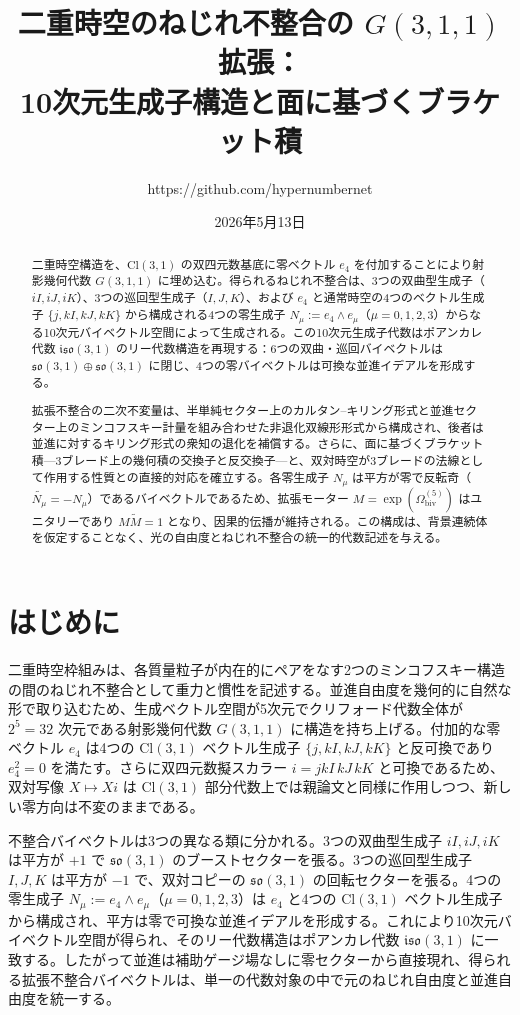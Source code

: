 \documentclass[11pt,a4paper]{article}
\title{二重時空のねじれ不整合の $G(3,1,1)$ 拡張：\\
10次元生成子構造と面に基づくブラケット積}
\author{https://github.com/hypernumbernet}
\date{2026年5月13日}
\begin{document}
\maketitle

\begin{abstract}
二重時空構造を、$\mathrm{Cl}(3,1)$ の双四元数基底に零ベクトル $e_{4}$ を付加することにより射影幾何代数 $G(3,1,1)$ に埋め込む。得られるねじれ不整合は、3つの双曲型生成子（$iI, iJ, iK$）、3つの巡回型生成子（$I, J, K$）、および $e_{4}$ と通常時空の4つのベクトル生成子 $\{j, kI, kJ, kK\}$ から構成される4つの零生成子 $N_{\mu} := e_{4}\wedge e_{\mu}$（$\mu=0,1,2,3$）からなる10次元バイベクトル空間によって生成される。この10次元生成子代数はポアンカレ代数 $\mathfrak{iso}(3,1)$ のリー代数構造を再現する：6つの双曲・巡回バイベクトルは $\mathfrak{so}(3,1)\oplus\mathfrak{so}(3,1)$ に閉じ、4つの零バイベクトルは可換な並進イデアルを形成する。

拡張不整合の二次不変量は、半単純セクター上のカルタン--キリング形式と並進セクター上のミンコフスキー計量を組み合わせた非退化双線形形式から構成され、後者は並進に対するキリング形式の衆知の退化を補償する。さらに、面に基づくブラケット積---3ブレード上の幾何積の交換子と反交換子---と、双対時空が3ブレードの法線として作用する性質との直接的対応を確立する。各零生成子 $N_{\mu}$ は平方が零で反転奇（$\widetilde{N_{\mu}}=-N_{\mu}$）であるバイベクトルであるため、拡張モーター $M=\exp(\Omega_{\text{biv}}^{(5)})$ はユニタリーであり $M\widetilde{M}=1$ となり、因果的伝播が維持される。この構成は、背景連続体を仮定することなく、光の自由度とねじれ不整合の統一的代数記述を与える。
\end{abstract}
 
\section{はじめに}
\label{sec:introduction}

二重時空枠組みは、各質量粒子が内在的にペアをなす2つのミンコフスキー構造の間のねじれ不整合として重力と慣性を記述する。並進自由度を幾何的に自然な形で取り込むため、生成ベクトル空間が5次元でクリフォード代数全体が $2^{5}=32$ 次元である射影幾何代数 $G(3,1,1)$ に構造を持ち上げる。付加的な零ベクトル $e_{4}$ は4つの $\mathrm{Cl}(3,1)$ ベクトル生成子 $\{j, kI, kJ, kK\}$ と反可換であり $e_{4}^{2}=0$ を満たす。さらに双四元数擬スカラー $i=jkI\,kJ\,kK$ と可換であるため、双対写像 $X\mapsto Xi$ は $\mathrm{Cl}(3,1)$ 部分代数上では親論文と同様に作用しつつ、新しい零方向は不変のままである。

不整合バイベクトルは3つの異なる類に分かれる。3つの双曲型生成子 $iI, iJ, iK$ は平方が $+1$ で $\mathfrak{so}(3,1)$ のブーストセクターを張る。3つの巡回型生成子 $I, J, K$ は平方が $-1$ で、双対コピーの $\mathfrak{so}(3,1)$ の回転セクターを張る。4つの零生成子 $N_{\mu} := e_{4}\wedge e_{\mu}$（$\mu=0,1,2,3$）は $e_{4}$ と4つの $\mathrm{Cl}(3,1)$ ベクトル生成子から構成され、平方は零で可換な並進イデアルを形成する。これにより10次元バイベクトル空間が得られ、そのリー代数構造はポアンカレ代数 $\mathfrak{iso}(3,1)$ に一致する。したがって並進は補助ゲージ場なしに零セクターから直接現れ、得られる拡張不整合バイベクトルは、単一の代数対象の中で元のねじれ自由度と並進自由度を統一する。
\end{document}
